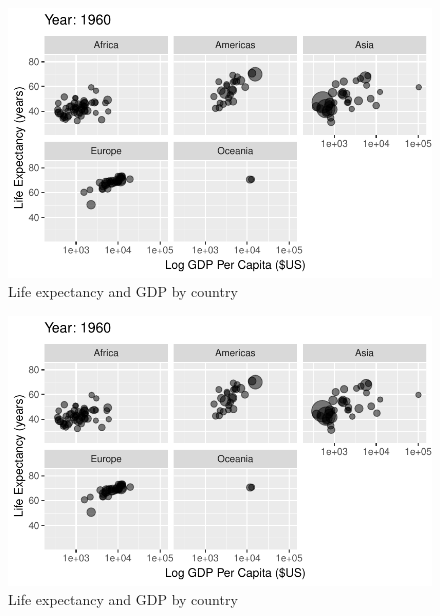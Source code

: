\documentclass[
  letterpaper,
  DIV=11,
  numbers=noendperiod]{scrreport}
\theoremstyle{definition}
\theoremstyle{remark}
\begin{document}
\begin{figure}

{\centering \includegraphics{index_files/figure-pdf/fig-anim-lifegdp-15.pdf}

}

\caption{\label{fig-anim-lifegdp-15}Life expectancy and GDP by country}

\end{figure}

\begin{figure}

{\centering \includegraphics{index_files/figure-pdf/fig-anim-lifegdp-16.pdf}

}

\caption{\label{fig-anim-lifegdp-16}Life expectancy and GDP by country}

\end{figure}
\end{document}
